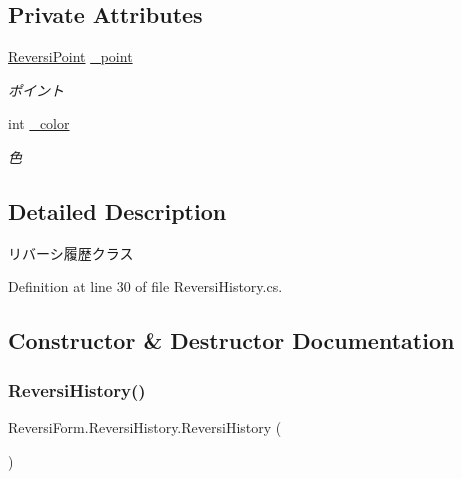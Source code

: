 \subsection*{Private Attributes}
\begin{DoxyCompactItemize}
\item 
\mbox{\label{class_reversi_form_1_1_reversi_history_ab71f2570479c6c36edda763111b4312b}} 
\hyperlink{class_reversi_form_1_1_reversi_point}{Reversi\+Point} \hyperlink{class_reversi_form_1_1_reversi_history_ab71f2570479c6c36edda763111b4312b}{\+\_\+point}
\begin{DoxyCompactList}\small\item\em ポイント \end{DoxyCompactList}\item 
\mbox{\label{class_reversi_form_1_1_reversi_history_a95653f11a686a190edd8759a98884185}} 
int \hyperlink{class_reversi_form_1_1_reversi_history_a95653f11a686a190edd8759a98884185}{\+\_\+color}
\begin{DoxyCompactList}\small\item\em 色 \end{DoxyCompactList}\end{DoxyCompactItemize}


\subsection{Detailed Description}
リバーシ履歴クラス 

Definition at line 30 of file Reversi\+History.\+cs.



\subsection{Constructor \& Destructor Documentation}
\mbox{\label{class_reversi_form_1_1_reversi_history_aef9c390a68d81077b70bc6181587106b}} 
\subsubsection{\texorpdfstring{Reversi\+History()}{ReversiHistory()}}
{\footnotesize\ttfamily Reversi\+Form.\+Reversi\+History.\+Reversi\+History (\begin{DoxyParamCaption}{ }\end{DoxyParamCaption})}



